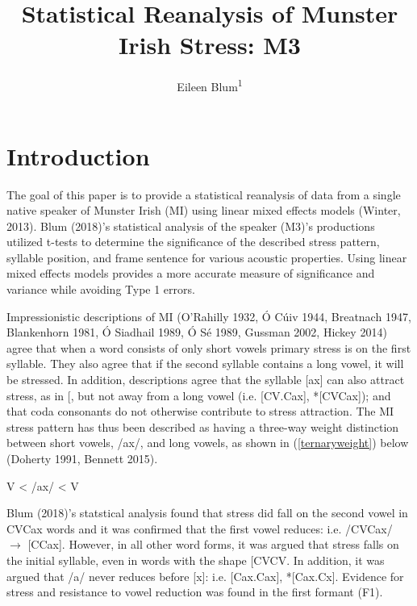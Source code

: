 \documentclass[floatsintext,man]{apa6}
\title{Statistical Reanalysis of Munster Irish Stress: M3}
\author{Eileen Blum\textsuperscript{1}}
\affiliation{
    \vspace{0.5cm}
          \textsuperscript{1} Rutgers University  }
\theoremstyle{definition}
\theoremstyle{definition}
\theoremstyle{definition}
\theoremstyle{remark}
\begin{document}
\maketitle

\setcounter{secnumdepth}{0}



\section{Introduction}\label{introduction}

The goal of this paper is to provide a statistical reanalysis of data
from a single native speaker of Munster Irish (MI) using linear mixed
effects models (Winter, 2013). Blum (2018)'s statistical analysis of the
speaker (M3)'s productions utilized t-tests to determine the
significance of the described stress pattern, syllable position, and
frame sentence for various acoustic properties. Using linear mixed
effects models provides a more accurate measure of significance and
variance while avoiding Type 1 errors.

Impressionistic descriptions of MI (O'Rahilly 1932, Ó Cúiv 1944,
Breatnach 1947, Blankenhorn 1981, Ó Siadhail 1989, Ó Sé 1989, Gussman
2002, Hickey 2014) agree that when a word consists of only short vowels
primary stress is on the first syllable. They also agree that if the
second syllable contains a long vowel, it will be stressed. In addition,
descriptions agree that the syllable {[}ax{]} can also attract stress,
as in {[}\textipa{b@"kax}{]}, but not away from a long vowel (i.e.
{[}CV\textipa{:}.Cax{]}, *{[}CVCax{]}); and that
coda consonants do not otherwise contribute to stress attraction. The MI
stress pattern has thus been described as having a three-way weight
distinction between short vowels, /ax/, and long vowels, as shown in
(\ref{ternaryweight}) below (Doherty 1991, Bennett 2015).

\begin{exe}
  \ex \label{ternaryweight}
  V < /ax/ < V\textipa{:}
\end{exe}

Blum (2018)'s statstical analysis found that stress did fall on the
second vowel in CVCax words and it was confirmed that the first vowel
reduces: i.e. /CVCax/ \(\rightarrow\) {[}CCax{]}. However,
in all other word forms, it was argued that stress falls on the initial
syllable, even in words with the shape {[}CVCV\textipa{:}{]}. In
addition, it was argued that /a/ never reduces before {[}x{]}: i.e.
{[}Cax.Cax{]}, *{[}Cax.Cx{]}. Evidence for stress
and resistance to vowel reduction was found in the first formant (F1).
\end{document}
